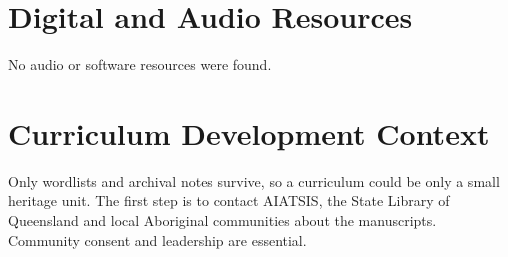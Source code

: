 \documentclass[12pt]{article}
\begin{document}
\section{Digital and Audio Resources}
No audio or software resources were found.

\section{Curriculum Development Context}
Only wordlists and archival notes survive, so a curriculum could be only a small heritage unit. The first step is to contact AIATSIS, the State Library of Queensland and local Aboriginal communities about the manuscripts. Community consent and leadership are essential.
\end{document}
